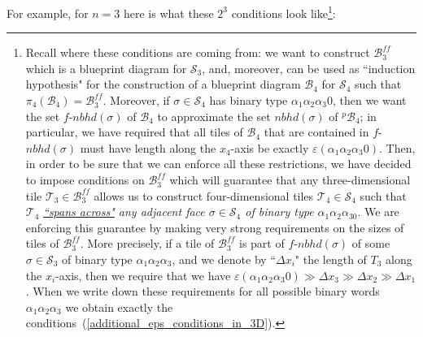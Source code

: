 \documentclass[12pt,letterpaper]{article}
\renewcommand{\S}{\mathcal{S}}
\newcommand{\T}{\mathcal{T}}
\newcommand{\B}{\mathcal{B}}
\newcommand{\eps}{\varepsilon}
\newcommand{\nbhd}{\mathit{nbhd}}
\renewcommand{\a}{\alpha}
\begin{document}
\noindent
For example, for $n=3$ here is what these $2^3$ conditions look like\footnote{Recall where these conditions are coming from: we want to construct $\B_3^\mathit{ff}$ which is a blueprint diagram for $\S_3$, and, moreover, can be used as ``induction hypothesis" for the construction of a blueprint diagram $\B_4$ for $\S_4$ such that $\pi_4(\B_4) = \B_3^\mathit{ff}$. 
Moreover, if $\sigma \in \S_4$ has binary type $\a_1\a_2\a_3 0$, then we want the set $f$-$\nbhd(\sigma)$ of $\B_4$ to approximate the set $\nbhd(\sigma)$ of $^p\!\B_4$; in particular, we have required  that all tiles of $\B_4$ that are contained in  $f$-$\nbhd(\sigma)$ must have length along the $x_4$-axis be exactly  $\eps(\a_1\a_2\a_3 0)$.  
Then, in order to be sure that we can enforce all these restrictions, we have decided to impose conditions on $\B_3^\mathit{ff}$ which will guarantee that any three-dimensional tile $\T_3 \in \B_3^\mathit{ff}$  allows us to construct four-dimensional tiles $\T_4 \in \S_4$ such that $\T_4$ {\em  \ul{``spans across"} any adjacent face $\sigma \in \S_4$ of binary type $\a_1\a_2\a_30$}. We are enforcing this guarantee by making very strong requirements on the sizes of  tiles of $\B_3^\mathit{ff}$. More precisely, if a tile  of $\B_3^\mathit{ff}$ is part of $f$-$\nbhd(\sigma)$ of some $\sigma \in \S_3$ of binary type $\a_1\a_2\a_3$, and we denote by ``$\Delta x_i$" the  length of $T_3$ along the $x_i$-axis, then we require that we have $\eps(\a_1\a_2\a_3 0) \gg \Delta x_3 \gg \Delta x_2 \gg \Delta x_1$. When we write down  these  requirements for all possible binary words $\a_1\a_2\a_3$ we obtain  exactly the conditions~(\ref{additional_eps_conditions_in_3D}).}:
%
\end{document}
